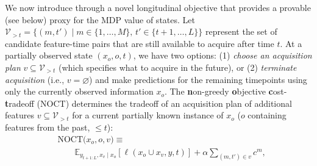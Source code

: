 We now introduce \texttt{\OurMethod} through a novel  longitudinal objective that provides a provable (see below) proxy for the MDP value of states. Let $\mathcal{V}_{>t} = {\{(m, t') \mid m \in \{1, \ldots, M\}, \, t' \in \{t+1, \ldots, L\}\}}$ represent the set of candidate feature-time pairs that are still available to acquire after time $t$. At a partially observed state $(x_o, o, t)$, we have two options: (1) \emph{choose an acquisition plan} $v \subseteq  \mathcal{V}_{>t}$ (which specifies what to acquire in the future), or (2) \emph{terminate acquisition} (i.e., $v = \varnothing$) and make predictions for the remaining timepoints using only the currently observed information $x_o$.
The \textbf{n}on-greedy \textbf{o}bjective \textbf{c}ost-\textbf{t}radeoff (NOCT) determines the tradeoff of an acquisition plan of additional features $v \subseteq  \mathcal{V}_{>t}$ for a current partially known instance of $x_o$ ($o$ containing features from the past, $\leq t$):
\begin{align}
&\mathrm{NOCT}\bigl({x}_{o}, o, v\bigr)   \equiv  \nonumber \\ 
&\quad\quad \mathbb{E}_{y_{t+1:L}, x_v \mid {x}_{o}}[\ell (x_o \cup x_v, y, t)] + \alpha \!\!\! \sum_{(m, t') \in v} \!\!\! c^m,\label{eq:obj} %
\end{align}

